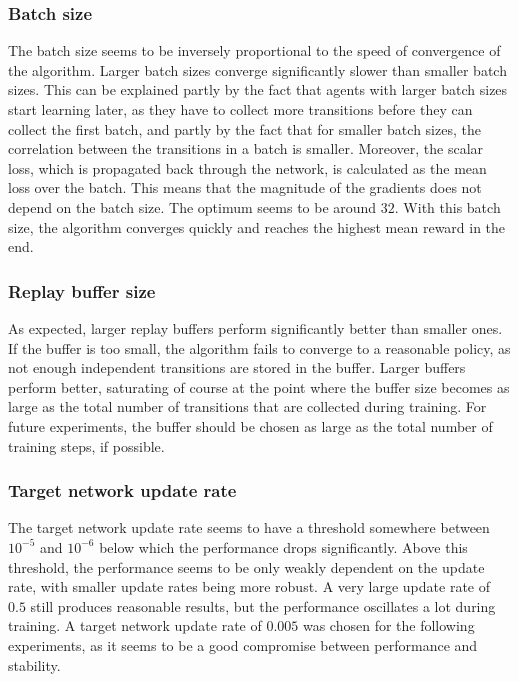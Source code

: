 \subsubsection{Batch size}
The batch size seems to be inversely proportional to the speed of convergence of the algorithm. Larger batch sizes converge significantly slower than smaller batch sizes. This can be explained partly by the fact that agents with larger batch sizes start learning later, as they have to collect more transitions before they can collect the first batch, and partly by the fact that for smaller batch sizes, the correlation between the transitions in a batch is smaller. Moreover, the scalar loss, which is propagated back through the network, is calculated as the mean loss over the batch. This means that the magnitude of the gradients does not depend on the batch size. The optimum seems to be around $32$. With this batch size, the algorithm converges quickly and reaches the highest mean reward in the end.

\subsubsection{Replay buffer size}
As expected, larger replay buffers perform significantly better than smaller ones. If the buffer is too small, the algorithm fails to converge to a reasonable policy, as not enough independent transitions are stored in the buffer. Larger buffers perform better, saturating of course at the point where the buffer size becomes as large as the total number of transitions that are collected during training. For future experiments, the buffer should be chosen as large as the total number of training steps, if possible. 

\subsubsection{Target network update rate}
The target network update rate seems to have a threshold somewhere between $10^{-5}$ and $10^{-6}$ below which the performance drops significantly. Above this threshold, the performance seems to be only weakly dependent on the update rate, with smaller update rates being more robust. A very large update rate of $0.5$ still produces reasonable results, but the performance oscillates a lot during training. A target network update rate of $0.005$ was chosen for the following experiments, as it seems to be a good compromise between performance and stability.

